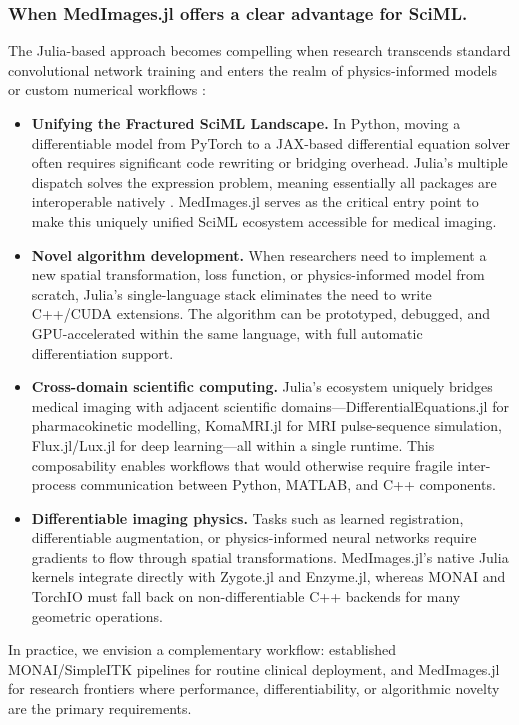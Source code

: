 \documentclass[10pt,letterpaper]{article}
\begin{document}
\subsubsection{When MedImages.jl offers a clear advantage for SciML.}
The Julia-based approach becomes compelling when research transcends standard convolutional network training and enters the realm of physics-informed models or custom numerical workflows \cite{RoeschGreener2023}:
\begin{itemize}
    \item \textbf{Unifying the Fractured SciML Landscape.} In Python, moving a differentiable model from PyTorch to a JAX-based differential equation solver often requires significant code rewriting or bridging overhead. Julia's multiple dispatch solves the expression problem, meaning essentially all packages are interoperable natively \cite{PalBhattacharya2024, EschleGl2023}. MedImages.jl serves as the critical entry point to make this uniquely unified SciML ecosystem accessible for medical imaging.
    \item \textbf{Novel algorithm development.} When researchers need to implement a new spatial transformation, loss function, or physics-informed model from scratch, Julia's single-language stack eliminates the need to write C++/CUDA extensions. The algorithm can be prototyped, debugged, and GPU-accelerated within the same language, with full automatic differentiation support.
    \item \textbf{Cross-domain scientific computing.} Julia's ecosystem uniquely bridges medical imaging with adjacent scientific domains---DifferentialEquations.jl for pharmacokinetic modelling, KomaMRI.jl \cite{CastilloPassiCoronado2023} for MRI pulse-sequence simulation, Flux.jl/Lux.jl \cite{pal2023lux} for deep learning---all within a single runtime. This composability enables workflows that would otherwise require fragile inter-process communication between Python, MATLAB, and C++ components.
    \item \textbf{Differentiable imaging physics.} Tasks such as learned registration, differentiable augmentation, or physics-informed neural networks require gradients to flow through spatial transformations. MedImages.jl's native Julia kernels integrate directly with Zygote.jl and Enzyme.jl, whereas MONAI and TorchIO must fall back on non-differentiable C++ backends for many geometric operations.
\end{itemize}

In practice, we envision a complementary workflow: established MONAI/SimpleITK pipelines for routine clinical deployment, and MedImages.jl for research frontiers where performance, differentiability, or algorithmic novelty are the primary requirements.
\end{document}

